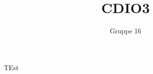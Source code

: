 \documentclass[12pt,a4paper]{paper}
\author{Gruppe 16}
\title{CDIO3}
\begin{document}
        
        \pagebreak
        
        \pagebreak
        TEst
    
\end{document}
